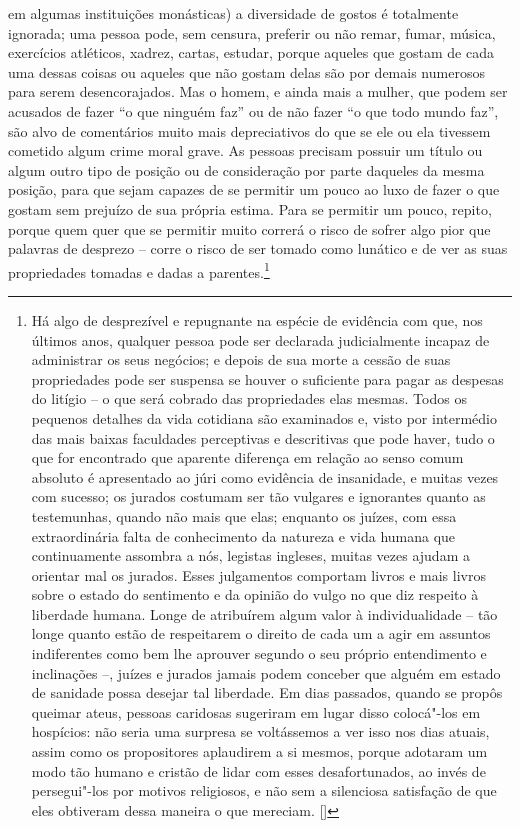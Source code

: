 em algumas instituições monásticas) a diversidade de gostos é
totalmente ignorada; uma pessoa pode, sem censura, preferir ou não
remar, fumar, música, exercícios atléticos, xadrez, cartas, estudar,
porque aqueles que gostam de cada uma dessas coisas ou aqueles que não
gostam delas são por demais numerosos para serem desencorajados. Mas o
homem, e ainda mais a mulher, que podem ser acusados de fazer “o que
ninguém faz” ou de não fazer “o que todo mundo faz”, são alvo de
comentários muito mais depreciativos do que se ele ou ela tivessem
cometido algum crime moral grave. As pessoas precisam possuir um título
ou algum outro tipo de posição ou de consideração por parte daqueles da
mesma posição, para que sejam capazes de se permitir um pouco ao luxo de
fazer o que gostam sem prejuízo de sua própria estima. Para se permitir
um pouco, repito, porque quem quer que se permitir muito correrá o
risco de sofrer algo pior que palavras de desprezo – corre o risco de
ser tomado como lunático e de ver as suas propriedades tomadas e dadas
a parentes.\footnote{ Há algo de desprezível e repugnante na espécie
de evidência com que, nos últimos anos, qualquer pessoa pode ser
declarada judicialmente incapaz de administrar os seus negócios; e
depois de sua morte a cessão de suas propriedades pode ser suspensa se
houver o suficiente para pagar as despesas do litígio – o que será
cobrado das propriedades elas mesmas. Todos os pequenos detalhes da
vida cotidiana são examinados e, visto por intermédio das mais baixas
faculdades perceptivas e descritivas que pode haver, tudo o que for
encontrado que aparente diferença em relação ao senso comum absoluto é
apresentado ao júri como evidência de insanidade, e muitas vezes com
sucesso; os jurados costumam ser tão vulgares e ignorantes quanto as
testemunhas, quando não mais que elas; enquanto os juízes, com essa
extraordinária falta de conhecimento da natureza e vida humana que
continuamente assombra a nós, legistas ingleses, muitas vezes ajudam a
orientar mal os jurados. Esses julgamentos comportam livros e mais
livros sobre o estado do sentimento e da opinião do vulgo no que diz
respeito à liberdade humana. Longe de atribuírem algum valor à
individualidade – tão longe quanto estão de respeitarem o direito de
cada um a agir em assuntos indiferentes como bem lhe aprouver segundo o
seu próprio entendimento e inclinações –, juízes e jurados jamais podem
conceber que alguém em estado de sanidade possa desejar tal liberdade.
Em dias passados, quando se propôs queimar ateus, pessoas caridosas
sugeriram em lugar disso colocá"-los em hospícios: não seria uma
surpresa se voltássemos a ver isso nos dias atuais, assim como os
propositores aplaudirem a si mesmos, porque adotaram um modo tão humano
e cristão de lidar com esses desafortunados, ao invés de persegui"-los
por motivos religiosos, e não sem a silenciosa satisfação de que eles
obtiveram dessa maneira o que mereciam. []}

